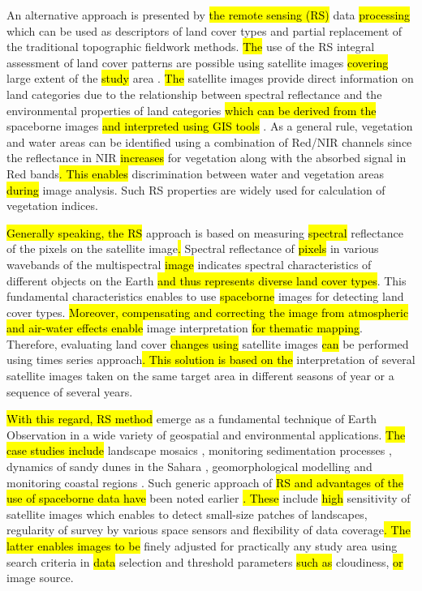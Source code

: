 \documentclass[land,article,submit,pdftex,moreauthors]{Definitions/mdpi}
\begin{document}
An alternative approach is presented by \hl{the remote sensing (RS)} data \hl{processing} which can be used as descriptors of land cover types and partial replacement of the traditional topographic fieldwork methods. \hl{The }use of the RS integral assessment of land cover patterns are possible using satellite images \hl{covering} large extent of the \hl{study} area \cite{ELGHOUL2023106733}. \hl{The} satellite images provide direct information on land categories due to the relationship between spectral reflectance and the environmental properties of land categories \hl{which can be derived from the} spaceborne images \hl{and interpreted using GIS tools} \cite{Allouche,Ruiz,Ray}. As a general rule, vegetation and water areas can be identified using a combination of Red/NIR channels since the reflectance in NIR \hl{increases} for vegetation along with the absorbed signal in Red bands\hl{. This enables} discrimination between water and vegetation areas \hl{during} image analysis. Such RS properties are widely used for calculation of vegetation indices. 

\hl{Generally speaking, the RS} approach is based on measuring \hl{spectral} reflectance of the pixels on the satellite image\hl{. }Spectral reflectance of \hl{pixels} in various wavebands of the multispectral \hl{image }indicates spectral characteristics of different objects on the Earth \hl{and thus represents diverse land cover types}. This fundamental characteristics enables to use \hl{spaceborne }images for detecting land cover types. \hl{Moreover, compensating and correcting the image from atmospheric and air-water effects enable }image interpretation \hl{for thematic mapping}. Therefore, evaluating land cover \hl{changes using} satellite images\hl{ can} be performed using times series approach\hl{. This solution is based on the} interpretation of several satellite images taken on the same target area in different seasons of year or a sequence of several years. 

\hl{With this regard, RS method} emerge as a fundamental technique of Earth Observation in a wide variety of geospatial and environmental applications. \hl{The case studies include }landscape mosaics \cite{BIARNES2021103281}, monitoring sedimentation processes \cite{TOWNSHEND1989177}, dynamics of sandy dunes in the Sahara \cite{Afrasinei}, geomorphological modelling \cite{Desprats} and monitoring coastal regions \cite{AMROUNI201973,Jaquet}. Such generic approach of \hl{RS and advantages of the use of spaceborne data have} been noted earlier \cite{RAMPHERI2023103359}\hl{. These} include \hl{high} sensitivity of satellite images which enables to detect small-size patches of landscapes, regularity of survey by various space sensors and flexibility of data coverage\hl{. The latter enables images to be} finely adjusted for practically any study area using search criteria in \hl{data} selection and threshold parameters \hl{such as }cloudiness, \hl{or} image source. 
\end{document}
